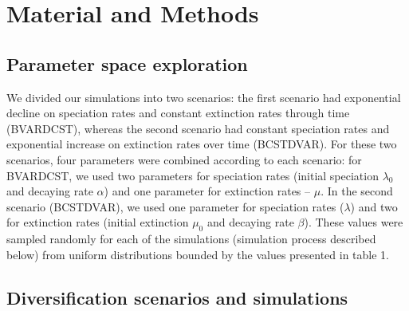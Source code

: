 \documentclass[11pt,]{article}
\begin{document}
\section{Material and Methods}\label{material-and-methods}

\subsection{Parameter space
exploration}\label{parameter-space-exploration}

We divided our simulations into two scenarios: the first scenario had
exponential decline on speciation rates and constant extinction rates
through time (BVARDCST), whereas the second scenario had constant
speciation rates and exponential increase on extinction rates over time
(BCSTDVAR). For these two scenarios, four parameters were combined
according to each scenario: for BVARDCST, we used two parameters for
speciation rates (initial speciation \(\lambda_0\) and decaying rate
\(\alpha\)) and one parameter for extinction rates -- \(\mu\). In the
second scenario (BCSTDVAR), we used one parameter for speciation rates
(\(\lambda\)) and two for extinction rates (initial extinction \(\mu_0\)
and decaying rate \(\beta\)). These values were sampled randomly for
each of the simulations (simulation process described below) from
uniform distributions bounded by the values presented in table 1.

\subsection{Diversification scenarios and
simulations}\label{diversification-scenarios-and-simulations}
\end{document}
